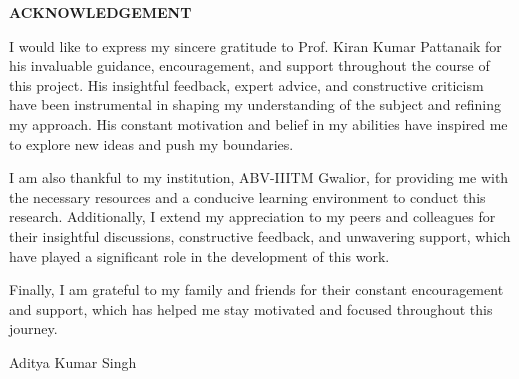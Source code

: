 \newpage
{}
\begin{center}
{\large \bf ACKNOWLEDGEMENT}
\end{center}

I would like to express my sincere gratitude to Prof. Kiran Kumar Pattanaik for his invaluable guidance, encouragement, and support throughout the course of this project. His insightful feedback, expert advice, and constructive criticism have been instrumental in shaping my understanding of the subject and refining my approach. His constant motivation and belief in my abilities have inspired me to explore new ideas and push my boundaries.
\par\vspace{0.2in}
I am also thankful to my institution, ABV-IIITM Gwalior, for providing me with the necessary resources and a conducive learning environment to conduct this research. Additionally, I extend my appreciation to my peers and colleagues for their insightful discussions, constructive feedback, and unwavering support, which have played a significant role in the development of this work.
\par\vspace{0.2in}
Finally, I am grateful to my family and friends for their constant encouragement and support, which has helped me stay motivated and focused throughout this journey.
\par\vspace{0.2in}
\begin{flushleft}
Aditya Kumar Singh
\end{flushleft}
